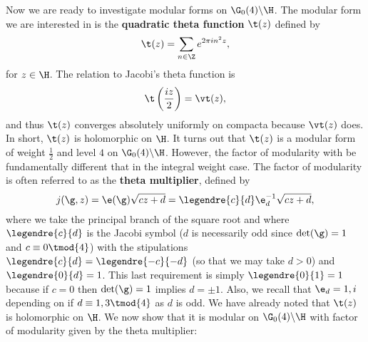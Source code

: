       Now we are ready to investigate modular forms on $\G_{0}(4)\backslash\H$. The modular form we are interested in is the \textbf{quadratic theta function} $\t(z)$ defined by
      \[
          \t(z) = \sum_{n \in \Z}e^{2\pi in^{2}z},
      \]
      for $z \in \H$. The relation to Jacobi's theta function is
      \begin{equation}\label{equ:Jacobi_theta_relation}
          \t\left(\frac{iz}{2}\right) = \vt(z),
      \end{equation}
      and thus $\t(z)$ converges absolutely uniformly on compacta because $\vt(z)$ does. In short, $\t(z)$ is holomorphic on $\H$. It turns out that $\t(z)$ is a modular form of weight $\frac{1}{2}$ and level $4$ on $\G_{0}(4)\backslash\H$. However, the factor of modularity with be fundamentally different that in the integral weight case. The factor of modularity is often referred to as the \textbf{theta multiplier}, defined by
      \[
          j(\g,z) = \e(\g)\sqrt{cz+d} = \legendre{c}{d}\e_{d}^{-1}\sqrt{cz+d},
      \]
      where we take the principal branch of the square root and where $\legendre{c}{d}$ is the Jacobi symbol ($d$ is necessarily odd since $\det(\g) = 1$ and $c \equiv 0 \tmod{4}$) with the stipulations $\legendre{c}{d} = \legendre{-c}{-d}$ (so that we may take $d > 0$) and $\legendre{0}{d} = 1$. This last requirement is simply $\legendre{0}{1} = 1$ because if $c = 0$ then $\det(\g) = 1$ implies $d = \pm 1$. Also, we recall that $\e_{d} = 1,i$ depending on if $d \equiv 1,3 \tmod{4}$ as $d$ is odd. We have already noted that $\t(z)$ is holomorphic on $\H$. We now show that it is modular on $\G_{0}(4)\backslash\H$ with factor of modularity given by the theta multiplier:

